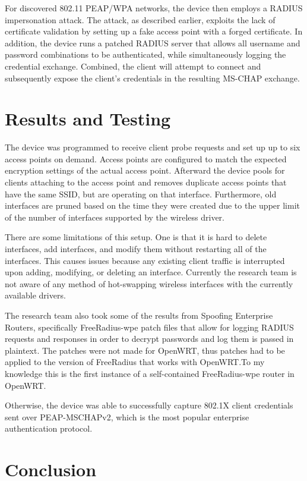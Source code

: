 \documentclass[journal, compsoc]{IEEEtran}
\begin{document}
For discovered 802.11 PEAP/WPA networks, the device then employs a
RADIUS impersonation attack. The attack, as described earlier,
exploits the lack of certificate validation by setting up a fake
access point with a forged certificate. In addition, the device runs a
patched RADIUS server that allows all username and password
combinations to be authenticated, while simultaneously logging the
credential exchange. Combined, the client will attempt to connect and
subsequently expose the client's credentials in the resulting MS-CHAP
exchange.

\section{Results and Testing}
\label{sec:results}

The device was programmed to receive client probe requests and set up
up to six access points on demand. Access points are configured to
match the expected encryption settings of the actual access
point. Afterward the device pools for clients attaching to the access
point and removes duplicate access points that have the same SSID, but
are operating on that interface. Furthermore, old interfaces are
pruned based on the time they were created due to the upper limit of
the number of interfaces supported by the wireless driver.

There are some limitations of this setup. One is that it is hard to
delete interfaces, add interfaces, and modify them without restarting
all of the interfaces. This causes issues because any existing client
traffic is interrupted upon adding, modifying, or deleting an
interface. Currently the research team is not aware of any method of
hot-swapping wireless interfaces with the currently available drivers.

The research team also took some of the results from Spoofing
Enterprise Routers, specifically FreeRadius-wpe patch files that allow
for logging RADIUS requests and responses in order to decrypt
passwords and log them is passed in plaintext. The patches were not
made for OpenWRT, thus patches had to be applied to the version of
FreeRadius that works with OpenWRT.\@ To my knowledge this is the first
instance of a self-contained FreeRadius-wpe router in OpenWRT.\@

Otherwise, the device was able to successfully capture 802.1X client
credentials sent over PEAP-MSCHAPv2, which is the most popular
enterprise authentication protocol.

\section{Conclusion}
\label{sec:conclusion}
\end{document}
